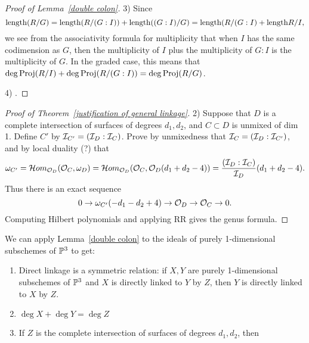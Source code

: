 \begin{proof}[Proof of Lemma~\ref{double colon}]
3) Since 
$$
{\rm length} (R/G) = {\rm length}(R/(G:I))+{\rm length}((G:I)/G) = {\rm length}(R/(G:I) +{\rm length} R/I,
$$ we see from the associativity formula for multiplicity that when $I$ has the same codimension as $G$, then the multiplicity of $I$ plus the
multiplicity of $G:I$ is the multiplicity of $G$. In the graded case, this means that
$\deg \operatorname{Proj}(R/I) +\deg \operatorname{Proj}(R/(G:I)) = \deg \operatorname{Proj}(R/G)$.

4) .
\end{proof}

 \begin{proof}[Proof of Theorem~\ref{justification of general linkage}
] 2) Suppose that $D$ is a complete intersection of surfaces of degrees $d_1,d_2$, and 
$C\subset D$ is unmixed of dim 1. Define $C'$ by ${\mathcal I}_{C'} = ({\mathcal I}_D:{\mathcal I}_C)$. Prove by unmixedness that 
${\mathcal I}_C = ({\mathcal I}_D:{\mathcal I}_{C'})$,  and by local duality (?) that 
$$
\omega_{C'} = \mathcal{H}om_{{\mathcal O}_D}({\mathcal O}_C, \omega_D) = 
\mathcal{H}om_{{\mathcal O}_D}({\mathcal O}_C, {\mathcal O}_D(d_1+d_2-4))
=  \frac{({\mathcal I}_D:{\mathcal I}_C)}{{\mathcal I}_{D}}(d_1+d_2-4).
$$
Thus there is an exact sequence
$$
0\to \omega_{C'}(-d_1-d_2+4) \to {\mathcal O}_D \to {\mathcal O}_C \to 0.
$$
Computing Hilbert polynomials and applying RR gives the genus formula.

 \end{proof}

We can apply Lemma~\ref{double colon} to the ideals of purely 1-dimensional subschemes of ${\mathbb P}^{3}$ to get:
\begin{corollary}
\begin{enumerate}
\item Direct linkage is a symmetric relation: if $X,Y$ are purely 1-dimensional subschemes of ${\mathbb P}^{3}$ and $X$ is directly linked to $Y$ by $Z$, then
$Y$ is directly linked to $X$ by $Z$. 
\item $\deg X+\deg Y = \deg Z$
\item If $Z$ is the complete intersection of surfaces of degrees $d_{1}, d_{2}$, then

\end{enumerate}
\end{corollary}

